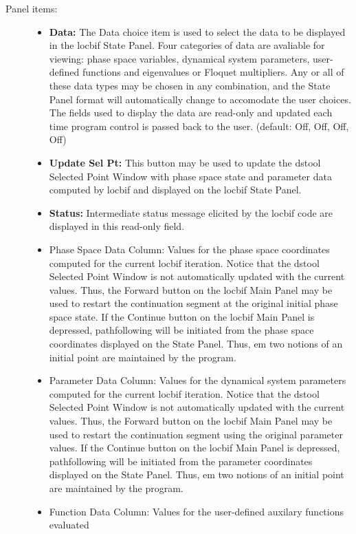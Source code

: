 \begin{description}
\item[Panel items:]\mbox{}
	\begin{itemize}
	   \item {\bf Data:} The Data choice item is used to select the data to be displayed in the locbif
	   State Panel.  Four categories of data are avaliable for viewing: phase space variables,
	   dynamical system parameters, user-defined functions and eigenvalues or Floquet multipliers.
	   Any or all of these data types may be chosen in any combination, and the State Panel format
	   will automatically change to accomodate the user choices.  The fields used to display the 
	   data are read-only and updated each time program control is passed back to the user.
	   (default: Off, Off, Off, Off)
           \item {\bf Update Sel Pt:} This button may be used to update the dstool Selected Point
	   Window with phase space state and parameter data computed by locbif and displayed on the
	   locbif State Panel.  
	   \item {\bf Status: } Intermediate status message elicited by the locbif code are displayed
	   in this read-only field. 
	   \item {Phase Space Data Column:} Values for the phase space coordinates computed for the 
	   current locbif iteration.  Notice that the dstool Selected Point Window is not automatically
	   updated with the current values.  Thus, the Forward button on the locbif Main Panel may 
	   be used to restart the continuation segment at the original initial phase space state.
	   If the Continue button on the locbif Main Panel is depressed, pathfollowing will be 
	   initiated from the phase space coordinates displayed on the State Panel.  Thus,  {em two}
	   notions of an initial point are maintained by the program.
	   \item {Parameter Data Column:} Values for the dynamical system parameters computed for the 
	   current locbif iteration.  Notice that the dstool Selected Point Window is not automatically
	   updated with the current values.  Thus, the Forward button on the locbif Main Panel may 
	   be used to restart the continuation segment using the original parameter values.
	   If the Continue button on the locbif Main Panel is depressed, pathfollowing will be 
	   initiated from the parameter coordinates displayed on the State Panel.  Thus,  {em two}
	   notions of an initial point are maintained by the program.
	   \item {Function Data Column: } Values for the user-defined auxilary functions evaluated

\end{itemize}
\end{description}
